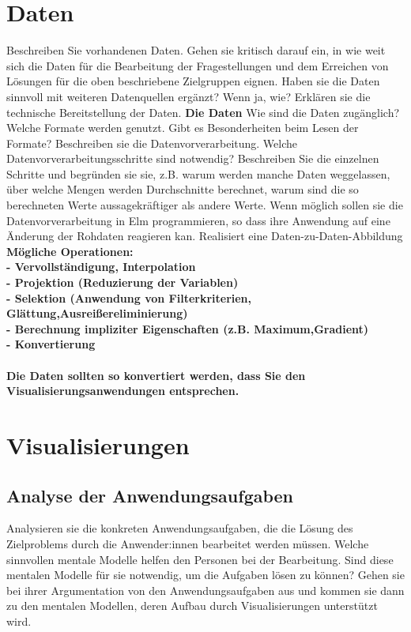 \documentclass[usegeometry=true]{scrartcl}
\begin{document}
\section{Daten}
Beschreiben Sie vorhandenen Daten. Gehen sie kritisch darauf ein, in wie weit sich die Daten für die Bearbeitung der Fragestellungen und dem Erreichen von Lösungen für die oben beschriebene Zielgruppen eignen. Haben sie die Daten sinnvoll mit weiteren Datenquellen ergänzt? Wenn ja, wie?
Erklären sie die technische Bereitstellung der Daten.
\textbf { Die Daten }
Wie sind die Daten zugänglich? Welche Formate werden genutzt. Gibt es Besonderheiten beim Lesen der Formate?
Beschreiben sie die Datenvorverarbeitung.
 Welche Datenvorverarbeitungsschritte sind notwendig? Beschreiben Sie die einzelnen Schritte und begründen sie sie, z.B. warum werden manche Daten weggelassen, über welche Mengen werden Durchschnitte berechnet, warum sind die so berechneten Werte aussagekräftiger als andere Werte. Wenn möglich sollen sie die Datenvorverarbeitung in Elm programmieren, so dass ihre Anwendung auf eine Änderung der Rohdaten reagieren kan.
 Realisiert eine Daten-zu-Daten-Abbildung\\
 \textbf { Mögliche Operationen:\\
    - Vervollständigung, Interpolation\\
    - Projektion (Reduzierung der Variablen)\\
    - Selektion (Anwendung von Filterkriterien, Glättung,Ausreißereliminierung)\\
    - Berechnung impliziter Eigenschaften (z.B. Maximum,Gradient)\\
    - Konvertierung\\
    \\
    Die Daten sollten so konvertiert werden, dass Sie den Visualisierungsanwendungen entsprechen. 
 }

\section{Visualisierungen}
\subsection{Analyse der Anwendungsaufgaben}
Analysieren sie die konkreten Anwendungsaufgaben, die die Lösung des Zielproblems durch die Anwender:innen bearbeitet werden müssen. 
Welche sinnvollen mentale Modelle helfen den Personen bei der Bearbeitung. 
Sind diese mentalen Modelle für sie notwendig, um die Aufgaben lösen zu können? Gehen sie bei ihrer Argumentation von den Anwendungsaufgaben aus und kommen sie dann zu den mentalen Modellen, deren Aufbau durch Visualisierungen unterstützt wird. 
\end{document}
